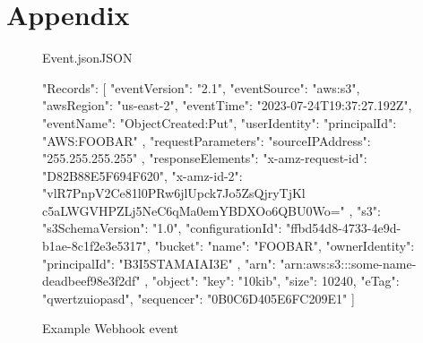 \chapter{Appendix}

\begin{figure}[!ht]
\begin{codeblock}{Event.json}{JSON}
\begin{javacode}
	{
		"Records": [
		{
			"eventVersion": "2.1",
			"eventSource": "aws:s3",
			"awsRegion": "us-east-2",
			"eventTime": "2023-07-24T19:37:27.192Z",
			"eventName": "ObjectCreated:Put",
			"userIdentity": {
				"principalId": "AWS:FOOBAR"
			},
			"requestParameters": {
				"sourceIPAddress": "255.255.255.255"
			},
			"responseElements": {
				"x-amz-request-id": "D82B88E5F694F620",
				"x-amz-id-2": "vlR7PnpV2Ce81l0PRw6jlUpck7Jo5ZsQjryTjKl
					c5aLWGVHPZLj5NeC6qMa0emYBDXOo6QBU0Wo="
			},
			"s3": {
				"s3SchemaVersion": "1.0",
				"configurationId": "ffbd54d8-4733-4e9d-b1ae-8c1f2e3e5317",
				"bucket": {
					"name": "FOOBAR",
					"ownerIdentity": {
						"principalId": "B3I5STAMAIAI3E"
					},
					"arn": "arn:aws:s3:::some-name-deadbeef98e3f2df"
				},
				"object": {
					"key": "10kib",
					"size": 10240,
					"eTag": "qwertzuiopasd",
					"sequencer": "0B0C6D405E6FC209E1"
				}
			}
		}
		]
	}
	\end{javacode}
\end{codeblock}
\caption{Example Webhook event}
\label{appendix:webhook}
\end{figure}

